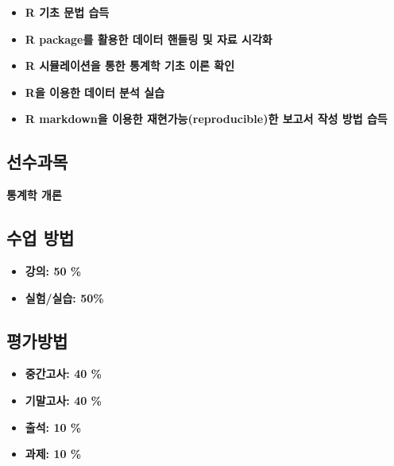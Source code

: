 \documentclass[
  11pt,
]{krantz}
\makeatletter
\providecommand{\tightlist}{%
  \setlength{\itemsep}{0pt}\setlength{\parskip}{0pt}}
\newenvironment{kframe}{%
\medskip{}
\setlength{\fboxsep}{.8em}
 \def\at@end@of@kframe{}%
 \ifinner\ifhmode%
  \def\at@end@of@kframe{\end{minipage}}%
  \begin{minipage}{\columnwidth}%
 \fi\fi%
 \def\FrameCommand##1{\hskip\@totalleftmargin \hskip-\fboxsep
 \colorbox{shadecolor}{##1}\hskip-\fboxsep
     \hskip-\linewidth \hskip-\@totalleftmargin \hskip\columnwidth}%
 \MakeFramed {\advance\hsize-\width
   \@totalleftmargin\z@ \linewidth\hsize
   \@setminipage}}%
 {\par\unskip\endMakeFramed%
 \at@end@of@kframe}
\renewenvironment{quote}{\begin{kframe}}{\end{kframe}}
\makeatother
\begin{document}
\begin{quote}
\begin{itemize}
\tightlist
\item
  \textbf{R 기초 문법 습득}
\item
  \textbf{R package를 활용한 데이터 핸들링 및 자료 시각화}
\item
  \textbf{R 시뮬레이션을 통한 통계학 기초 이론 확인}
\item
  \textbf{R을 이용한 데이터 분석 실습}
\item
  \textbf{R markdown을 이용한 재현가능(reproducible)한 보고서 작성 방법 습득}
\end{itemize}
\end{quote}

\hypertarget{pre-course}{%
\subsection*{선수과목}\label{pre-course}}


\begin{quote}
\textbf{통계학 개론}
\end{quote}

\hypertarget{course-method}{%
\subsection*{수업 방법}\label{course-method}}


\begin{itemize}
\tightlist
\item
  \textbf{강의: 50 \%}
\item
  \textbf{실험/실습: 50\%}
\end{itemize}

\hypertarget{grade-method}{%
\subsection*{평가방법}\label{grade-method}}


\begin{quote}
\begin{itemize}
\tightlist
\item
  \textbf{중간고사: 40 \%}
\item
  \textbf{기말고사: 40 \%}
\item
  \textbf{출석: 10 \%}
\item
  \textbf{과제: 10 \%}
\end{itemize}
\end{quote}
\end{document}
